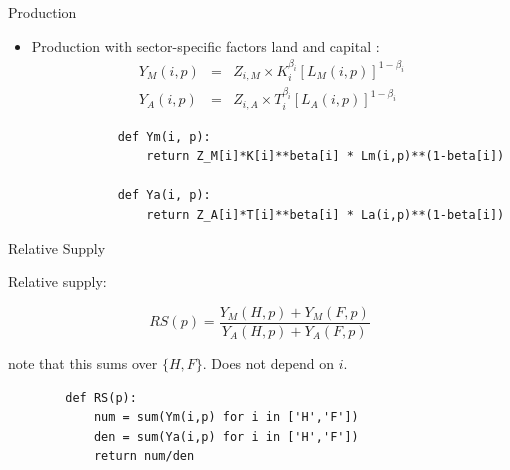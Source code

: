 \documentclass[notes,11pt, aspectratio=169, xcolor=table]{beamer}
\newenvironment{wideitemize}{\itemize\addtolength{\itemsep}{10pt}}{\enditemize}
\begin{document}
\begin{frame}[fragile=singleslide]{Production}

\begin{itemize}
    \item Production with sector-specific factors land  and capital :
        \begin{eqnarray*}\label{eq: production}
            Y_{M}(i,p) &=&  Z_{i,M} \times K_{i}^{\beta_i} [L_{M}(i,p)]^{1-\beta_i}  \\
            Y_{A}(i,p) &=&  Z_{i,A} \times T_{i}^{\beta_i} [L_{A}(i,p)]^{1-\beta_i} 
        \end{eqnarray*}

        \begin{verbatim}
            def Ym(i, p):
                return Z_M[i]*K[i]**beta[i] * Lm(i,p)**(1-beta[i])

            def Ya(i, p):
                return Z_A[i]*T[i]**beta[i] * La(i,p)**(1-beta[i])
        \end{verbatim}
\end{itemize}
    
\end{frame}


\begin{frame}[fragile=singleslide]{Relative Supply}

\begin{wideitemize}
    
    \item Relative supply:

    \begin{equation*}
        \boxed{
        RS(p) = \frac{Y_{M}(H,p) + Y_{M}(F,p)}{Y_{A}(H,p) + Y_{A}(F,p)}
        }
    \end{equation*}

    note that this sums over $\{ H, F \}$. Does not depend on $i$.
        \begin{verbatim}
        def RS(p):
            num = sum(Ym(i,p) for i in ['H','F'])
            den = sum(Ya(i,p) for i in ['H','F'])
            return num/den    
        \end{verbatim}
        
    
\end{wideitemize}

    
\end{frame}
\end{document}
